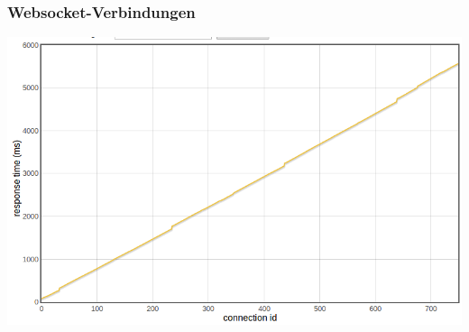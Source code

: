 \begin{frame}
\frametitle{Websocket-Verbindungen}
	\begin{center}
		\includegraphics[scale=0.3]{performance/750-sockets.png}
	
	\end{center}
\end{frame}

